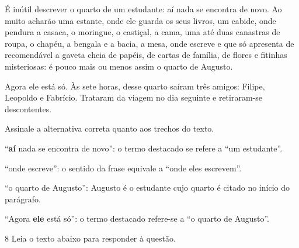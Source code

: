 
\begin{myquote}

É inútil descrever o quarto de um estudante: aí nada se
encontra de novo. Ao muito acharão uma estante, onde ele guarda
os seus livros, um cabide, onde pendura a casaca, o moringue, o
castiçal, a cama, uma até duas canastras de roupa, o chapéu, a
bengala e a bacia, a mesa, onde escreve e que só apresenta de
recomendável a gaveta cheia de papéis, de cartas de família, de
flores e fitinhas misteriosas: é pouco mais ou menos assim o
quarto de Augusto.

Agora ele está só. Às sete horas, desse quarto saíram três
amigos: Filipe, Leopoldo e Fabrício. Trataram da viagem no dia 
seguinte e retiraram-se descontentes.


\end{myquote}


Assinale a alternativa correta quanto aos trechos do texto.

\begin{escolha}
    
    \item ``\textbf{aí} nada se encontra de novo'': o termo destacado se refere a ``um estudante''.
    
    \item ``onde escreve'': o sentido da frase equivale a ``onde eles escrevem''.  
    
    \item ``o quarto de Augusto'': Augusto é o estudante cujo quarto é citado no início do parágrafo.  
    
    \item ``Agora \textbf{ele} está só'': o termo destacado refere-se a ``o quarto de Augusto''.   

\end{escolha}

\pagebreak

\num{8} Leia o texto abaixo para responder à questão. 

